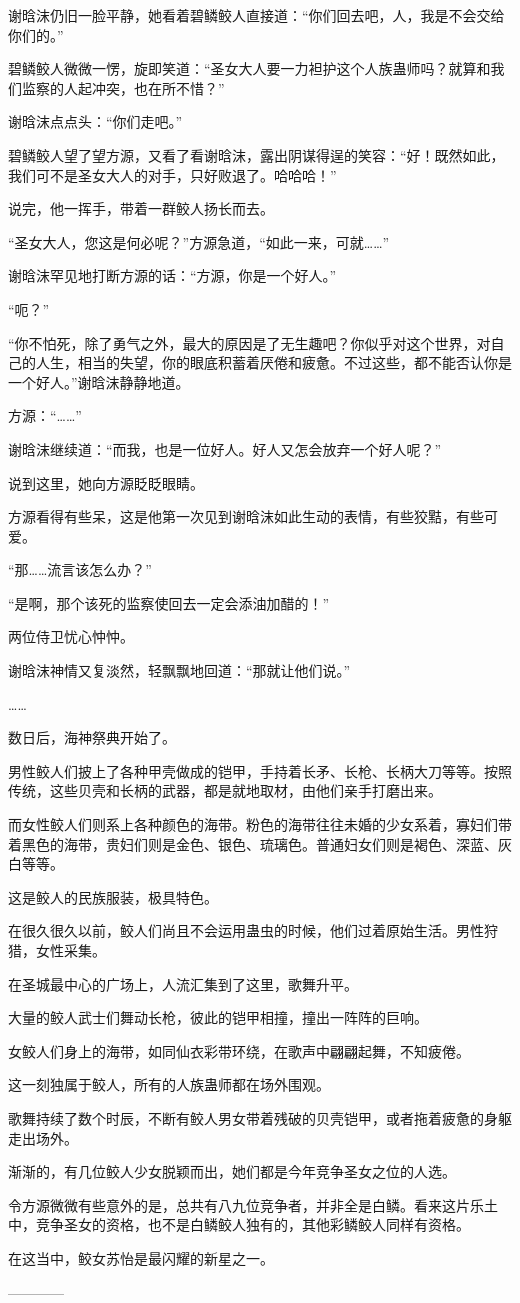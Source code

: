 \begin{this_body}
谢晗沫仍旧一脸平静，她看着碧鳞鲛人直接道：“你们回去吧，人，我是不会交给你们的。”

碧鳞鲛人微微一愣，旋即笑道：“圣女大人要一力袒护这个人族蛊师吗？就算和我们监察的人起冲突，也在所不惜？”

谢晗沫点点头：“你们走吧。”

碧鳞鲛人望了望方源，又看了看谢晗沫，露出阴谋得逞的笑容：“好！既然如此，我们可不是圣女大人的对手，只好败退了。哈哈哈！”

说完，他一挥手，带着一群鲛人扬长而去。

“圣女大人，您这是何必呢？”方源急道，“如此一来，可就……”

谢晗沫罕见地打断方源的话：“方源，你是一个好人。”

“呃？”

“你不怕死，除了勇气之外，最大的原因是了无生趣吧？你似乎对这个世界，对自己的人生，相当的失望，你的眼底积蓄着厌倦和疲惫。不过这些，都不能否认你是一个好人。”谢晗沫静静地道。

方源：“……”

谢晗沫继续道：“而我，也是一位好人。好人又怎会放弃一个好人呢？”

说到这里，她向方源眨眨眼睛。

方源看得有些呆，这是他第一次见到谢晗沫如此生动的表情，有些狡黠，有些可爱。

“那……流言该怎么办？”

“是啊，那个该死的监察使回去一定会添油加醋的！”

两位侍卫忧心忡忡。

谢晗沫神情又复淡然，轻飘飘地回道：“那就让他们说。”

……

数日后，海神祭典开始了。

男性鲛人们披上了各种甲壳做成的铠甲，手持着长矛、长枪、长柄大刀等等。按照传统，这些贝壳和长柄的武器，都是就地取材，由他们亲手打磨出来。

而女性鲛人们则系上各种颜色的海带。粉色的海带往往未婚的少女系着，寡妇们带着黑色的海带，贵妇们则是金色、银色、琉璃色。普通妇女们则是褐色、深蓝、灰白等等。

这是鲛人的民族服装，极具特色。

在很久很久以前，鲛人们尚且不会运用蛊虫的时候，他们过着原始生活。男性狩猎，女性采集。

在圣城最中心的广场上，人流汇集到了这里，歌舞升平。

大量的鲛人武士们舞动长枪，彼此的铠甲相撞，撞出一阵阵的巨响。

女鲛人们身上的海带，如同仙衣彩带环绕，在歌声中翩翩起舞，不知疲倦。

这一刻独属于鲛人，所有的人族蛊师都在场外围观。

歌舞持续了数个时辰，不断有鲛人男女带着残破的贝壳铠甲，或者拖着疲惫的身躯走出场外。

渐渐的，有几位鲛人少女脱颖而出，她们都是今年竞争圣女之位的人选。

令方源微微有些意外的是，总共有八九位竞争者，并非全是白鳞。看来这片乐土中，竞争圣女的资格，也不是白鳞鲛人独有的，其他彩鳞鲛人同样有资格。

在这当中，鲛女苏怡是最闪耀的新星之一。

------------

\end{this_body}

